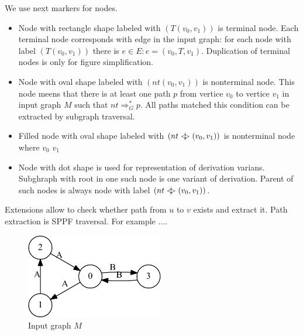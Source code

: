 \documentclass{sig-alternate} %
\begin{document}
We use next markers for nodes.
\begin{itemize}
    \item Node with rectangle shape labeled with $(T (v_0, v_1))$ is terminal node. 
    Each terminal node corresponds with edge in the input graph: for each node with label $(T (v_0, v_1))$ there is $e\in E: e=(v_0,T,v_1)$.
    Duplication of terminal nodes is only for figure simplification.
    \item Node with oval shape labeled with $(nt (v_0, v_1))$ is nonterminal node. 
    This node meens that there is at least one path $p$ from vertice $v_0$ to vertice $v_1$ in input graph $M$ such that $nt \Rightarrow^*_G p$.
    All paths matched this condition can be extracted by subgraph traversal. 
    \item Filled node with oval shape labeled with $(nt <\mkern-11mu | \mkern-11mu> (v_0, v_1))$ is nonterminal node where $v_0$ $v_1$    
    \item Node with dot shape is used for representation of derivation varians. Subghraph with root in one such node is one variant of derivation. Parent of such nodes is always node with label $(nt <\mkern-11mu | \mkern-11mu> (v_0, v_1))$.
\end{itemize}

Extensions allow to check whether path from $u$ to $v$ exists and extract it. Path extraction is SPPF traversal. For example ....

\begin{figure}[h]
    \begin{center}
        \includegraphics[width=6cm]{dot/input.pdf}
        \caption{Input graph $M$}
        \label{input}        
    \end{center}
\end{figure}
\end{document}

